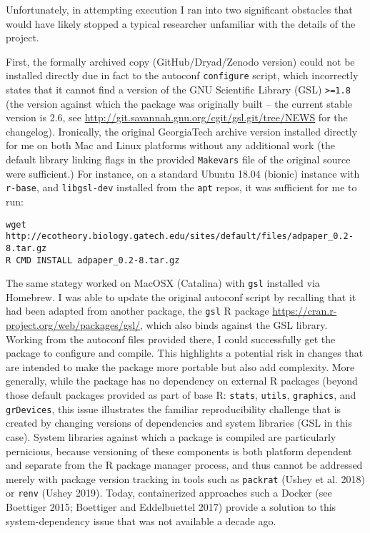 \documentclass[
]{rescience}
\begin{document}
Unfortunately, in attempting execution I ran into two significant
obstacles that would have likely stopped a typical researcher unfamiliar
with the details of the project.

First, the formally archived copy (GitHub/Dryad/Zenodo version) could
not be installed directly due in fact to the autoconf \texttt{configure}
script, which incorrectly states that it cannot find a version of the
GNU Scientific Library (GSL) \texttt{\textgreater{}=1.8} (the version
against which the package was originally built -- the current stable
version is 2.6, see
\url{http://git.savannah.gnu.org/cgit/gsl.git/tree/NEWS} for the
changelog). Ironically, the original GeorgiaTech archive version
installed directly for me on both Mac and Linux platforms without any
additional work (the default library linking flags in the provided
\texttt{Makevars} file of the original source were sufficient.) For
instance, on a standard Ubuntu 18.04 (bionic) instance with
\texttt{r-base}, and \texttt{libgsl-dev} installed from the \texttt{apt}
repos, it was sufficient for me to run:

\begin{verbatim}
wget http://ecotheory.biology.gatech.edu/sites/default/files/adpaper_0.2-8.tar.gz
R CMD INSTALL adpaper_0.2-8.tar.gz
\end{verbatim}

The same stategy worked on MacOSX (Catalina) with \texttt{gsl} installed
via Homebrew. I was able to update the original autoconf script by
recalling that it had been adapted from another package, the
\texttt{gsl} R package
\url{https://cran.r-project.org/web/packages/gsl/}, which also binds
against the GSL library. Working from the autoconf files provided there,
I could successfully get the package to configure and compile. This
highlights a potential risk in changes that are intended to make the
package more portable but also add complexity. More generally, while the
package has no dependency on external R packages (beyond those default
packages provided as part of base R: \texttt{stats}, \texttt{utils},
\texttt{graphics}, and \texttt{grDevices}, this issue illustrates the
familiar reproducibility challenge that is created by changing versions
of dependencies and system libraries (GSL in this case). System
libraries against which a package is compiled are particularly
pernicious, because versioning of these components is both platform
dependent and separate from the R package manager process, and thus
cannot be addressed merely with package version tracking in tools such
as \texttt{packrat} (Ushey et al. 2018) or \texttt{renv} (Ushey 2019).
Today, containerized approaches such a Docker (see Boettiger 2015;
Boettiger and Eddelbuettel 2017) provide a solution to this
system-dependency issue that was not available a decade ago.
\end{document}
